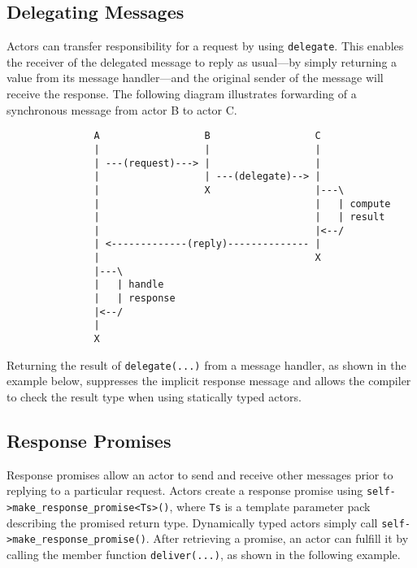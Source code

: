

\clearpage
\subsection{Delegating Messages}
\label{delegate}

Actors can transfer responsibility for a request by using \lstinline^delegate^. This enables the receiver of the delegated message to reply as usual---by simply returning a value from its message handler---and the original sender of the message will receive the response. The following diagram illustrates forwarding of a synchronous message from actor B to actor C.

\begin{footnotesize}
\begin{verbatim}
               A                  B                  C
               |                  |                  |
               | ---(request)---> |                  |
               |                  | ---(delegate)--> |
               |                  X                  |---\
               |                                     |   | compute
               |                                     |   | result
               |                                     |<--/
               | <-------------(reply)-------------- |
               |                                     X
               |---\
               |   | handle
               |   | response
               |<--/
               |
               X
\end{verbatim}
\end{footnotesize}

Returning the result of \lstinline^delegate(...)^ from a message handler, as shown in the example below, suppresses the implicit response message and allows the compiler to check the result type when using statically typed actors.



\subsection{Response Promises}
\label{promise}

Response promises allow an actor to send and receive other messages prior to replying to a particular request. Actors create a response promise using \lstinline^self->make_response_promise<Ts>()^, where \lstinline^Ts^ is a template parameter pack describing the promised return type. Dynamically typed actors simply call \lstinline^self->make_response_promise()^. After retrieving a promise, an actor can fulfill it by calling the member function \lstinline^deliver(...)^, as shown in the following example.

